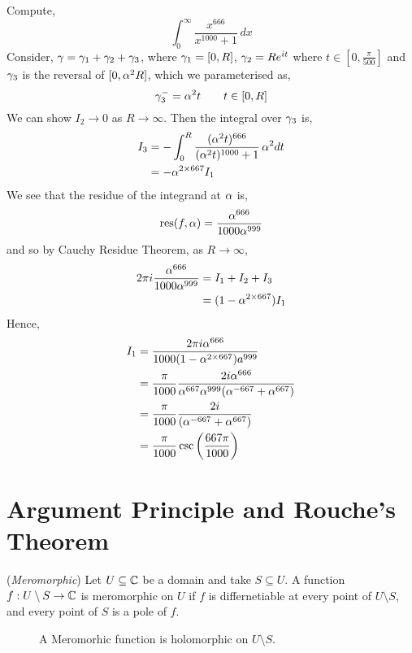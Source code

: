 \documentclass{article}
\begin{document}
Compute,
$$ \int_0^\infty {\frac{x^{666}}{x^{1000} + 1}}\,dx $$
Consider, $\gamma = \gamma_1 + \gamma_2 + \gamma_3$, where $\gamma_1 = [0, R]$, $\gamma_2 = Re^{it}$ where $t \in [0, \frac{\pi}{500}]$ and $\gamma_3$ is the reversal of $[0, \alpha^2R]$, which we parameterised as,
$$ \gamma_3^{-} = \alpha^2t \qquad t \in [0, R] $$
We can show $I_2 \to 0$ as $R \to \infty$. Then the integral over $\gamma_3$ is,
\begin{align*}
  I_3 &= -\int_0^R \frac{(\alpha^2 t)^{666}}{(\alpha^2 t)^{1000} + 1}\, \alpha^2dt \\
  &= -\alpha^{2 \times 667}I_1
\end{align*}
We see that the residue of the integrand at $\alpha$ is,
$$ \operatorname*{res} (f, \alpha) = \frac{\alpha^{666}}{1000\alpha^{999}} $$
and so by Cauchy Residue Theorem, as $R \to \infty$,
\begin{align*}
  2\pi i \frac{\alpha^{666}}{1000\alpha^{999}} &= I_1 + I_2 + I_3\\
  &= (1 - \alpha^{2 \times 667})I_1
\end{align*}
Hence,
\begin{align*}
  I_1 &= \frac{2\pi i \alpha^{666}}{1000(1 - \alpha^{2 \times 667}) a^{999}}\\
  &= \frac{\pi}{1000} \frac{2i \alpha^{666}}{\alpha^{667}\alpha^{999}(\alpha^{-667} + \alpha^{667})}\\
  &= \frac{\pi}{1000} \frac{2i}{(\alpha^{-667} + \alpha^{667})}\\
  &= \frac{\pi}{1000} \csc \left( \frac{667\pi}{1000} \right)
\end{align*}

\section{Argument Principle and Rouche's Theorem}

\begin{ndefi}{(\textit{Meromorphic})}
  Let $U \subseteq \mathbb{C}$ be a domain and take $S \subseteq U$. A function $f : U\setminus S \to \mathbb{C}$ is meromorphic on $U$ if $f$ is differnetiable at every point of $U\setminus S$, and every point of $S$ is a pole of $f$.
\end{ndefi}

\begin{figure}[!ht]
  \centering
  \caption{A Meromorhic function is holomorphic on $U \setminus S$.}
\end{figure}
\end{document}
